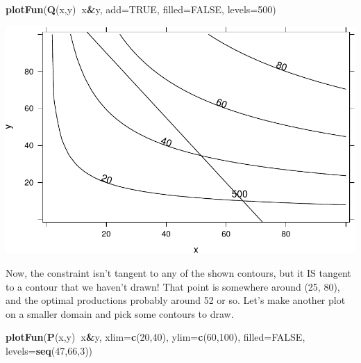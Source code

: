 \documentclass[
]{book}
\newenvironment{Shaded}{\begin{snugshade}}{\end{snugshade}}
\newcommand{\DataTypeTok}[1]{\textcolor[rgb]{0.13,0.29,0.53}{#1}}
\newcommand{\DecValTok}[1]{\textcolor[rgb]{0.00,0.00,0.81}{#1}}
\newcommand{\KeywordTok}[1]{\textcolor[rgb]{0.13,0.29,0.53}{\textbf{#1}}}
\newcommand{\NormalTok}[1]{#1}
\newcommand{\OperatorTok}[1]{\textcolor[rgb]{0.81,0.36,0.00}{\textbf{#1}}}
\newcommand{\OtherTok}[1]{\textcolor[rgb]{0.56,0.35,0.01}{#1}}
\begin{document}
\begin{Shaded}
\begin{Highlighting}[]
\KeywordTok{plotFun}\NormalTok{(}\KeywordTok{Q}\NormalTok{(x,y)}\OperatorTok{~}\NormalTok{x}\OperatorTok{&}\NormalTok{y, }\DataTypeTok{add=}\OtherTok{TRUE}\NormalTok{, }\DataTypeTok{filled=}\OtherTok{FALSE}\NormalTok{, }\DataTypeTok{levels=}\DecValTok{500}\NormalTok{)}
\end{Highlighting}
\end{Shaded}

\includegraphics{_bookdown_files/math135_handbook_files/figure-latex/unnamed-chunk-114-1.pdf}

Now, the constraint isn't tangent to any of the shown contours, but it IS tangent to a contour that we haven't drawn! That point is somewhere around (25, 80), and the optimal productions probably around 52 or so. Let's make another plot on a smaller domain and pick some contours to draw.

\begin{Shaded}
\begin{Highlighting}[]
\KeywordTok{plotFun}\NormalTok{(}\KeywordTok{P}\NormalTok{(x,y)}\OperatorTok{~}\NormalTok{x}\OperatorTok{&}\NormalTok{y, }\DataTypeTok{xlim=}\KeywordTok{c}\NormalTok{(}\DecValTok{20}\NormalTok{,}\DecValTok{40}\NormalTok{), }\DataTypeTok{ylim=}\KeywordTok{c}\NormalTok{(}\DecValTok{60}\NormalTok{,}\DecValTok{100}\NormalTok{), }\DataTypeTok{filled=}\OtherTok{FALSE}\NormalTok{, }\DataTypeTok{levels=}\KeywordTok{seq}\NormalTok{(}\DecValTok{47}\NormalTok{,}\DecValTok{66}\NormalTok{,}\DecValTok{3}\NormalTok{))}
\end{Highlighting}
\end{Shaded}
\end{document}
